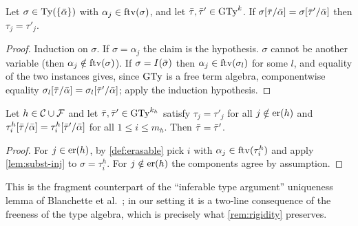 \begin{lemma}
  \label{lem:subst-inj}
  Let $\sigma \in \mathrm{Ty}(\{\bar{\alpha}\})$ with $\alpha_j \in \mathrm{ftv}(\sigma)$,
  and let $\bar{\tau}, \bar{\tau}' \in \mathrm{GTy}^{k}$.  If
  $\sigma[\bar{\tau}/\bar{\alpha}] = \sigma[\bar{\tau}'/\bar{\alpha}]$ then
  $\tau_j = \tau'_j$.
\end{lemma}

\begin{proof}
  Induction on $\sigma$.  If $\sigma = \alpha_j$ the claim is the
  hypothesis.  $\sigma$ cannot be another variable (then
  $\alpha_j \notin \mathrm{ftv}(\sigma)$).  If $\sigma = I(\bar{\sigma})$ then
  $\alpha_j \in \mathrm{ftv}(\sigma_l)$ for some $l$, and equality of the two
  instances gives, since $\mathrm{GTy}$ is a free term algebra, componentwise
  equality $\sigma_l[\bar{\tau}/\bar{\alpha}] =
  \sigma_l[\bar{\tau}'/\bar{\alpha}]$; apply the induction hypothesis.
\end{proof}

\begin{lemma}
  \label{lem:inference-unique}
  Let $h \in \mathcal{C}\cup\mathcal{F}$ and let
  $\bar{\tau}, \bar{\tau}' \in \mathrm{GTy}^{k_h}$ satisfy $\tau_j = \tau'_j$ for all
  $j \notin \mathrm{er}(h)$ and
  $\tau^h_i[\bar{\tau}/\bar{\alpha}] = \tau^h_i[\bar{\tau}'/\bar{\alpha}]$ for
  all $1 \le i \le m_h$.  Then $\bar{\tau} = \bar{\tau}'$.
\end{lemma}

\begin{proof}
  For $j \in \mathrm{er}(h)$, by \cref{def:erasable} pick $i$ with
  $\alpha_j \in \mathrm{ftv}(\tau^h_i)$ and apply \cref{lem:subst-inj} to
  $\sigma = \tau^h_i$.  For $j \notin \mathrm{er}(h)$ the components agree by
  assumption.
\end{proof}

This is the fragment counterpart of the ``inferable type argument''
uniqueness lemma of Blanchette et
al.~\cite{BlanchetteBohmePopescuSmallbone2016}; in our setting it is a
two-line consequence of the freeness of the type algebra, which is
precisely what \cref{rem:rigidity} preserves.

